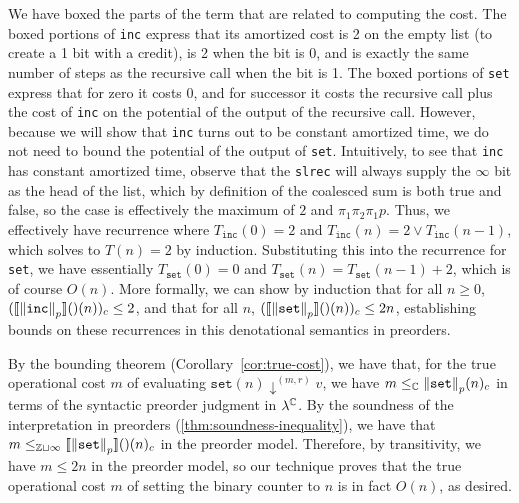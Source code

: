 We have boxed the parts of the term that are related to computing the
cost.  The boxed portions of \texttt{inc} express that its amortized
cost is 2 on the empty list (to create a 1 bit with a credit), is 2 when
the bit is 0, and is exactly the same number of steps as the recursive
call when the bit is 1.  The boxed portions of \texttt{set} express that
for zero it costs 0, and for successor it costs the recursive call plus
the cost of \texttt{inc} on the potential of the output of the recursive
call.  However, because we will show that \texttt{inc} turns out to be
constant amortized time, we do not need to bound the potential of the
output of \texttt{set}.  Intuitively, to see that \texttt{inc} has
constant amortized time, observe that the \texttt{slrec} will always
supply the $\infty$ bit as the head of the list, which by definition of
the coalesced sum is both true and false, so the case is effectively the
maximum of $2$ and $\pi_1 \pi_2 \pi_1 p$.  Thus, we effectively have
recurrence where $T_{\texttt{inc}}(0) = 2$ and $T_{\texttt{inc}}(n) = 2
\vee T_{\texttt{inc}}(n-1)$, which solves to $T(n) = 2$ by induction.
Substituting this into the recurrence for \texttt{set}, we have
essentially $T_{\texttt{set}}(0) = 0$ and $T_{\texttt{set}}(n) =
T_{\texttt{set}}(n-1) + 2$, which is of course $O(n)$.  More formally,
we can show by induction that for all $n \geq 0$,
$(\llbracket \left\lVert\texttt{inc}\right\rVert_p \rrbracket()(n))_c \leq 2$, and that for all $n$,
$(\llbracket \left\lVert\texttt{set}\right\rVert_p \rrbracket()(n))_c \leq 2n$,
establishing bounds on these recurrences in this denotational semantics
in preorders.  

By the bounding theorem (Corollary~\ref{cor:true-cost}), we have that,
for the true operational cost $m$ of evaluating $\texttt{set}(n)
\downarrow^{(m,r)} v$, we have $m \le_{\mathbb{C}} {\left\lVert\texttt{set}\right\rVert_p}(n)_c$
in terms of the syntactic preorder judgment in $\lambda^{\mathbb{C}}$.  By the
soundness of the interpretation in preorders
(\autoref{thm:soundness-inequality}), we have that $m
\le_{\mathbb{Z} \sqcup \infty} \llbracket \left\lVert\texttt{set}\right\rVert_p \rrbracket()(n)_c$ in
the preorder model.  Therefore, by transitivity, we have $m \le 2n$ in
the preorder model, so our technique proves that the true operational
cost $m$ of setting the binary counter to $n$ is in fact $O(n)$,
as desired.



